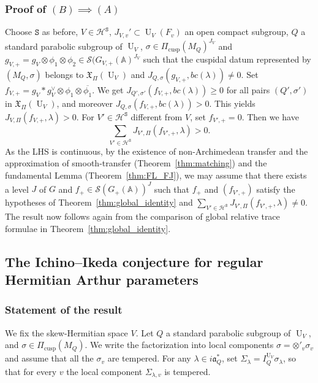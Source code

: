 \documentclass[letterpaper,11pt]{amsart}
\newcommand{\fa}{\mathfrak{a}}
\newcommand{\bA}{\mathbb{A}}
\newcommand{\cH}{\mathcal{H}}
\newcommand{\cS}{\mathcal{S}}
\newcommand{\tS}{\mathtt{S}}
\newcommand{\<}{\negthickspace}
\DeclareMathOperator{\U}{U}
\DeclareMathOperator{\cusp}{cusp}
\theoremstyle{definition}
\theoremstyle{plain}
\theoremstyle{remark}
\numberwithin{equation}{section}
\begin{document}
\subsubsection{Proof of $(B)\implies (A)$}
Choose $\tS$ as before, $V \in \cH^\tS$, $J_{V,v}' \subset \U_V(F_v)$ an open compact subgroup, $Q$ a standard parabolic subgroup of $\U_V$, $\sigma \in \Pi_{\cusp}(M_Q)^{J_V}$ and $g_{V,+}=g_{V} \otimes \phi_1 \otimes \phi_2 \in \cS(G_{V,+}(\bA)^{J_V}$ such that the cuspidal datum represented by $(M_Q,\sigma)$ belongs to $\mathfrak{X}_\Pi(\U_V)$ and $J_{Q,\sigma}(g_{V,+},bc(\lambda))\neq 0$. Set $f_{V,+}=g_V*g_{V}^\vee \otimes \phi_1 \otimes \overline{\phi_1}$. We get $J_{Q',\sigma'}(f_{V,+},bc(\lambda)) \geq 0$ for all pairs $(Q',\sigma')$ in $\mathfrak{X}_\Pi(\U_V)$, and moreover $J_{Q,\sigma}(f_{V,+},bc(\lambda))> 0$. This yields $J_{V,\Pi}(f_{V,+},\lambda)>0$. For $V' \in \cH^\tS$ different from $V$, set $f_{V',+}= 0$. Then we have 
\begin{equation*}
    \sum_{V' \in \cH^{\tS}} J_{V',\Pi}(f_{V',+},\lambda)>0.
\end{equation*}
As the LHS is continuous, by the existence of non-Archimedean transfer and the approximation of smooth-transfer (Theorem~\ref{thm:matching}) and the fundamental Lemma (Theorem~\ref{thm:FL_FJ}), we may assume that there exists a level $J$ of $G$ and $f_+ \in \cS(G_+(\bA))^{J}$ such that $f_+$ and $(f_{V',+})$ satisfy the hypotheses of Theorem~\ref{thm:global_identity} and $\sum_{V' \in \cH^{\tS}} J_{V',\Pi}(f_{V',+},\lambda) \neq 0$. The result now follows again from the comparison of global relative trace formulae in Theorem~\ref{thm:global_identity}.



\subsection[The Ichino--Ikeda conjecture]{The Ichino--Ikeda conjecture for regular Hermitian Arthur parameters}
\label{sec:proof_II}

\subsubsection{Statement of the result}

We fix the skew-Hermitian space $V$. Let $Q$ a standard parabolic subgroup of $\U_V$, and $\sigma \in \Pi_{\cusp}(M_Q)$. We write the factorization into local components $\sigma=\otimes'_v \sigma_v$ and assume that all the $\sigma_v$ are tempered. For any $\lambda \in i \fa_Q^*$, set $\Sigma_\lambda=I_Q^{\U_V}\sigma_\lambda$, so that for every $v$ the local component $\Sigma_{\lambda,v}$ is tempered. 
\end{document}
